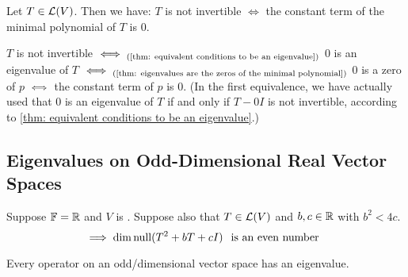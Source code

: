 \begin{thm} 
  Let $T \in \mathcal{L} (V)$. Then we have: $T$ is not invertible $\iff$ the constant term of the minimal polynomial of $T$ is $0$.
\end{thm}
\begin{prf}
  $T$ is not invertible $\iff_{\text{(\ref{thm: equivalent conditions to be an eigenvalue})}}$ $0$ is an eigenvalue of $T$ $\iff_{(\text{\ref{thm: eigenvalues are the zeros of the minimal polynomial})}}$ $0$ is a zero of $p$ $\mathsmaller{\iff}$ the constant term of $p$ is $0$.
  (In the first equivalence, we have actually used that $0$ is an eigenvalue of $T$ if and only if $T-0I$ is not invertible, according to \ref{thm: equivalent conditions to be an eigenvalue}.)
\end{prf}

\subsection{Eigenvalues on Odd-Dimensional Real Vector Spaces}
\begin{thm}
  Suppose $\mathbb{F} = \mathbb{R}$ and $V$ is \fd.
  Suppose also that $T \in \mathcal{L} (V)$ and $b,c \in \mathbb{R}$ with $b^2 < 4c$. 
  \begin{equation}
    \implies \dim \operatorname{null} (T^2 +bT +cI) \;\;\, \text{is an even number}\;\;
  \end{equation}
\end{thm}

\begin{thm}
  Every operator on an odd\-/dimensional vector space has an eigenvalue.
\end{thm}